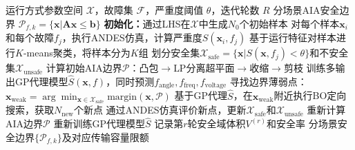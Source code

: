\begin{algorithm}[htbp]
\caption{GP+BO+AIA闭环融合安全边界辨识算法}
\label{alg:closed_loop}
\begin{algorithmic}[1]
\REQUIRE 运行方式参数空间 $\mathcal{X}$，故障集 $\mathcal{F}$，严重度阈值 $\theta$，迭代轮数 $R$
\ENSURE 分场景AIA安全边界 $\mathcal{P}_{f,k} = \{\mathbf{x} | \mathbf{A}\mathbf{x} \leq \mathbf{b}\}$
\STATE \textbf{初始化：}通过LHS在$\mathcal{X}$中生成$N_0$个初始样本
\STATE 对每个样本$\mathbf{x}_i$和每个故障$f_j$，执行ANDES仿真，计算严重度$S(\mathbf{x}_i, f_j)$
\STATE 基于运行特征对样本进行$K$-means聚类，将样本分为$K$组
    \STATE 划分安全集$\mathcal{X}_{\text{safe}} = \{\mathbf{x} | S(\mathbf{x}, f_j) < \theta\}$和不安全集$\mathcal{X}_{\text{unsafe}}$
    \STATE 计算初始AIA边界$\mathcal{P}$：凸包$\to$LP分离超平面$\to$收缩$\to$剪枝
\ENDFOR
\STATE 训练多输出GP代理模型$\hat{S}(\mathbf{x}, f)$，同时预测$f_{\text{angle}}, f_{\text{freq}}, f_{\text{voltage}}$
        \STATE 寻找边界薄弱点：$\mathbf{x}_{\text{weak}} = \arg\min_{\mathbf{x} \in \mathcal{X}_{\text{safe}}} \text{margin}(\mathbf{x}, \mathcal{P})$
        \STATE 基于GP代理$\hat{S}$，在$\mathbf{x}_{\text{weak}}$附近执行BO定向搜索，获取$N_{\text{new}}$个新点
        \STATE 通过ANDES仿真评价新点，更新$\mathcal{X}_{\text{safe}}$和$\mathcal{X}_{\text{unsafe}}$
        \STATE 重新计算AIA边界$\mathcal{P}$
    \ENDFOR
    \STATE 重新训练GP代理模型$\hat{S}$
    \STATE 记录第$r$轮安全域体积$V^{(r)}$和安全率
\ENDFOR
\RETURN 分场景安全边界$\{\mathcal{P}_{f,k}\}$及对应传输容量限额
\end{algorithmic}
\end{algorithm}
